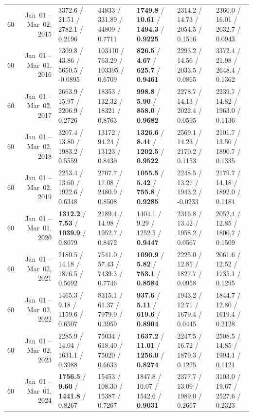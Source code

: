 \begin{longtable}{r r l l l l l}
60 & Jan~01 -- Mar~02, 2015 & 3372.6 / 21.51 / 2782.1 / 0.2196 & 44833 / 331.89 / 44809 / 0.7711 & \textbf{1749.8} / \textbf{10.61} / \textbf{1494.3} / \textbf{0.9225} & 2314.2 / 14.73 / 2054.5 / 0.1516 & 2360.0 / 16.01 / 2032.7 / 0.0943 \\
60 & Jan~01 -- Mar~01, 2016 & 7309.8 / 43.86 / 5650.5 / -0.0895 & 103410 / 763.29 / 103395 / 0.6709 & \textbf{826.5} / \textbf{4.67} / \textbf{625.7} / \textbf{0.9461} & 2293.2 / 14.56 / 2033.5 / 0.0865 & 3372.4 / 21.98 / 2648.4 / 0.1362 \\
60 & Jan~01 -- Mar~02, 2017 & 2663.9 / 15.97 / 2206.9 / 0.2726 & 18353 / 132.32 / 18321 / 0.8763 & \textbf{998.8} / \textbf{5.90} / \textbf{858.0} / \textbf{0.9682} & 2278.7 / 14.13 / 2022.4 / 0.0595 & 2239.7 / 14.82 / 1963.0 / 0.1136 \\
60 & Jan~01 -- Mar~02, 2018 & 3207.4 / 13.80 / 1983.2 / 0.5559 & 13172 / 94.24 / 13123 / 0.8430 & \textbf{1326.6} / \textbf{8.41} / \textbf{1202.5} / \textbf{0.9522} & 2569.1 / 14.23 / 2170.2 / 0.1153 & 2101.7 / 13.50 / 1890.7 / 0.1335 \\
60 & Jan~01 -- Mar~02, 2019 & 2253.4 / 13.60 / 1922.6 / 0.6348 & 2707.7 / 17.08 / 2480.9 / 0.8508 & \textbf{1055.5} / \textbf{5.42} / \textbf{755.8} / \textbf{0.9285} & 2248.5 / 13.27 / 1943.2 / -0.0233 & 2179.7 / 14.18 / 1892.0 / 0.1184 \\
60 & Jan~01 -- Mar~01, 2020 & \textbf{1312.2} / \textbf{7.53} / \textbf{1039.9} / 0.8079 & 2189.4 / 14.98 / 1952.7 / 0.8472 & 1404.1 / 9.29 / 1252.5 / \textbf{0.9447} & 2316.8 / 13.42 / 1958.2 / 0.0567 & 2052.4 / 12.85 / 1800.7 / 0.1509 \\
60 & Jan~01 -- Mar~02, 2021 & 2180.5 / 14.18 / 1876.5 / 0.5692 & 7541.0 / 57.43 / 7439.3 / 0.7746 & \textbf{1090.9} / \textbf{5.82} / \textbf{753.1} / \textbf{0.8584} & 2225.0 / 12.85 / 1827.7 / 0.0958 & 2061.6 / 12.52 / 1735.1 / 0.1295 \\
60 & Jan~01 -- Mar~02, 2022 & 1465.3 / 9.18 / 1159.6 / 0.6507 & 8315.1 / 61.37 / 7979.9 / 0.3959 & \textbf{937.6} / \textbf{5.11} / \textbf{619.6} / \textbf{0.8904} & 1943.2 / 12.71 / 1679.4 / 0.0445 & 1844.7 / 12.80 / 1619.4 / 0.2128 \\
60 & Jan~01 -- Mar~02, 2023 & 2285.9 / 14.04 / 1631.1 / 0.3988 & 75034 / 618.40 / 75020 / 0.6633 & \textbf{1637.2} / \textbf{11.01} / \textbf{1256.0} / \textbf{0.8274} & 2247.5 / 16.72 / 1879.3 / 0.1225 & 2508.5 / 14.85 / 1994.1 / 0.1121 \\
60 & Jan~01 -- Mar~01, 2024 & \textbf{1756.5} / \textbf{9.60} / \textbf{1441.8} / 0.8267 & 15453 / 108.30 / 15387 / 0.7267 & 1847.8 / 10.07 / 1542.6 / \textbf{0.9031} & 2377.7 / 13.09 / 1989.0 / 0.2667 & 3103.0 / 19.67 / 2527.6 / 0.2323 \\

\end{longtable}
